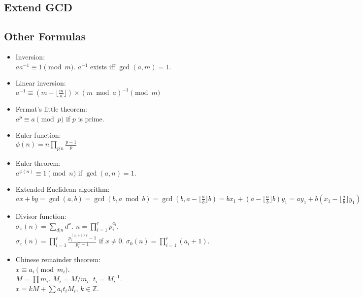 \documentclass[twocolumn]{article}
\begin{document}
\subsection{Extend GCD}



\subsection{Other Formulas}
\begin{itemize}
    \item Inversion:\\ $aa^{-1} \equiv 1 \pmod{m}$. $a^{-1}$ exists iff $\gcd(a,m)=1$.
    
    \item Linear inversion:\\ $a^{-1} \equiv (m - \lfloor\frac{m}{a}\rfloor) \times (m \bmod a)^{-1} \pmod{m}$
    
    \item Fermat's little theorem:\\ $a^p \equiv a \pmod{p}$ if $p$ is prime.
    
    \item Euler function:\\ $\phi(n)=n \prod_{p|n} \frac{p-1}{p}$
    
    \item Euler theorem:\\ $a^{\phi(n)} \equiv 1 \pmod{n}$ if $\gcd(a,n) = 1$.
    
    \item Extended Euclidean algorithm:\\
    $ax+by=\gcd(a,b)=\gcd(b, a \bmod b)=\gcd(b, a-\lfloor\frac{a}{b}\rfloor b)=bx_1+(a-\lfloor\frac{a}{b}\rfloor b)y_1=ay_1+b(x_1-\lfloor\frac{a}{b}\rfloor y_1)$
    
    \item Divisor function:\\ $\sigma_x(n) = \sum_{d|n}d^x$. $n=\prod_{i=1}^r p_i^{a_i}$.\\ $\sigma_x(n)=\prod_{i=1}^r \frac{p_i^{(a_i+1)x}-1}{p_i^x-1}$ if $x \neq 0$. $\sigma_0(n)=\prod_{i=1}^r (a_i+1)$.
    
    \item Chinese remainder theorem:\\ $x \equiv a_i \pmod{m_i}$.\\
        $M=\prod m_i$. $M_i=M/m_i$. $t_i=M_i^{-1}$.\\
        $x = kM + \sum a_i t_i M_i$, $k \in \mathbb{Z}$.
\end{itemize}
\end{document}
